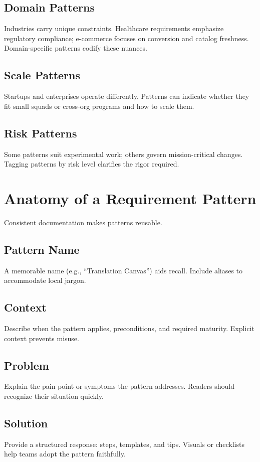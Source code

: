 \subsection{Domain Patterns}
Industries carry unique constraints. Healthcare requirements emphasize regulatory compliance; e-commerce focuses on conversion and catalog freshness. Domain-specific patterns codify these nuances.

\subsection{Scale Patterns}
Startups and enterprises operate differently. Patterns can indicate whether they fit small squads or cross-org programs and how to scale them.

\subsection{Risk Patterns}
Some patterns suit experimental work; others govern mission-critical changes. Tagging patterns by risk level clarifies the rigor required.

\section{Anatomy of a Requirement Pattern}
\label{sec:pattern-anatomy}

Consistent documentation makes patterns reusable.

\subsection{Pattern Name}
A memorable name (e.g., ``Translation Canvas'') aids recall. Include aliases to accommodate local jargon.

\subsection{Context}
Describe when the pattern applies, preconditions, and required maturity. Explicit context prevents misuse.

\subsection{Problem}
Explain the pain point or symptoms the pattern addresses. Readers should recognize their situation quickly.

\subsection{Solution}
Provide a structured response: steps, templates, and tips. Visuals or checklists help teams adopt the pattern faithfully.

